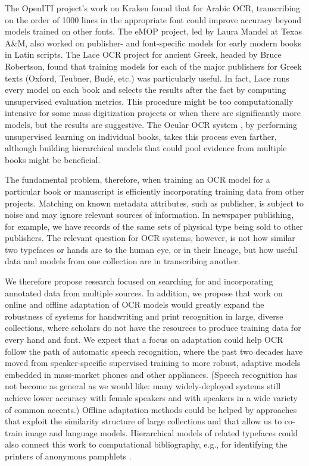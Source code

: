 \documentclass[twoside,11pt]{report}
\begin{document}
The OpenITI project's work on Kraken \citep{kiessling17:_impor_new_devel_arabog_optic} found that for Arabic OCR, transcribing on the order of 1000 lines in the appropriate font could improve accuracy beyond models trained on other fonts.  The eMOP project, led by Laura Mandel at Texas A\&M, also worked on publisher- and font-specific models for early modern books in Latin scripts. The Lace OCR project for ancient Greek, headed by Bruce Robertson, found that training models for each of the major publishers for Greek texts (Oxford, Teubner, Budé, etc.) was particularly useful. In fact, Lace runs every model on each book and selects the results after the fact by computing unsupervised evaluation metrics. This procedure might be too computationally intensive for some mass digitization projects or when there are significantly more models, but the results are suggestive. The Ocular OCR system \citep{berg-kirkpatrick13:_unsup_trans_histor_docum,garrette15:_unsup_code_switc_multil_histor_docum_trans}, by performing unsupervised learning on individual books, takes this process even farther, although building hierarchical models that could pool evidence from multiple books might be beneficial.

The fundamental problem, therefore, when training an OCR model for a particular book or manuscript is efficiently incorporating training data from other projects. Matching on known metadata attributes, such as publisher, is subject to noise and may ignore relevant sources of information. In newspaper publishing, for example, we have records of the same sets of physical type being sold to other publishers. The relevant question for OCR systems, however, is not how similar two typefaces or hands are to the human eye, or in their lineage, but how useful data and models from one collection are in transcribing another.

We therefore propose research focused on searching for and incorporating annotated data from multiple sources. In addition, we propose that work on online and offline adaptation of OCR models would greatly expand the robustness of systems for handwriting and print recognition in large, diverse collections, where scholars do not have the resources to produce training data for every hand and font. We expect that a focus on adaptation could help OCR follow the path of automatic speech recognition, where the past two decades have moved from speaker-specific supervised training to more robust, adaptive models embedded in mass-market phones and other appliances. (Speech recognition has not become as general as we would like: many widely-deployed systems still achieve lower accuracy with female speakers and with speakers in a wide variety of common accents.) Offline adaptation methods could be helped by approaches that exploit the similarity structure of large collections \citep{yalniz11:_partial_duplic_detec_large_book_collec} and that allow us to co-train image and language models. Hierarchical models of related typefaces could also connect this work to computational bibliography, e.g., for identifying the printers of anonymous pamphlets \citep{berg-kirkpatrick18:_print_probab}.
\end{document}
